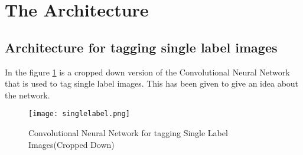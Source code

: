 \section{The Architecture}\label{sec:SysArchi}

\subsection{Architecture for tagging single label images}
In the figure \ref{singlelabel} is a cropped down version of the Convolutional Neural Network that is used to tag single label images. This has been given to give an idea about the network.

\begin{figure}[h!]
  \centering
  \texttt{[image: singlelabel.png]}
  \caption{Convolutional Neural Network for tagging Single Label Images(Cropped Down)} \label{singlelabel}
\end{figure}

